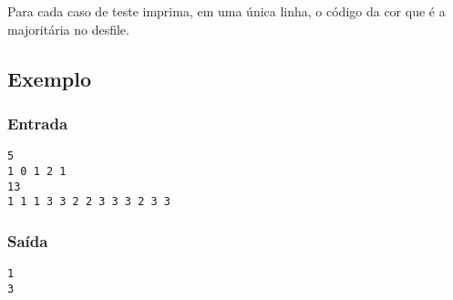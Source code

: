 Para cada caso de teste imprima, em uma única linha, o código da cor que é
a majoritária no desfile.

\subsection*{Exemplo}

\begin{multicols}{2}
\subsubsection*{Entrada}
\begin{verbatim}
5
1 0 1 2 1
13
1 1 1 3 3 2 2 3 3 3 2 3 3
\end{verbatim}
\columnbreak
\subsubsection*{Saída}
\begin{verbatim}
1
3
\end{verbatim}
\end{multicols}
